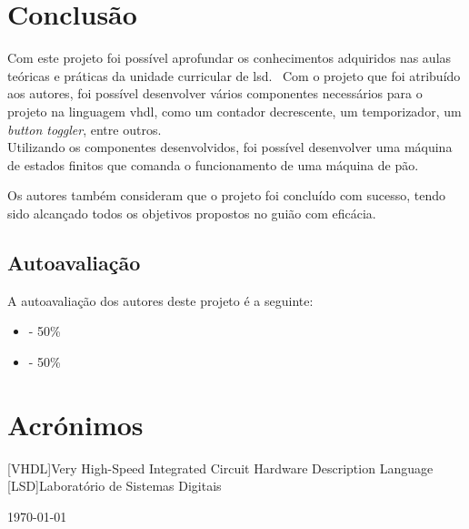 \documentclass{article}
\begin{document}
    \section{Conclusão}\label{sec:conclusao}
        Com este projeto foi possível aprofundar os conhecimentos adquiridos nas aulas teóricas e práticas da unidade curricular de \acs{lsd}. \ Com o projeto que foi atribuído aos autores, foi possível desenvolver vários componentes necessários para o projeto na linguagem \acs{vhdl}, como um contador decrescente, um temporizador, um \textit{button toggler}, entre outros. \\
        Utilizando os componentes desenvolvidos, foi possível desenvolver uma máquina de estados finitos que comanda o funcionamento de uma máquina de pão. \\
        \par Os autores também consideram que o projeto foi concluído com sucesso, tendo sido alcançado todos os objetivos propostos no guião com eficácia.

    \subsection{Autoavaliação}\label{subsec:autoavaliacao}
        A autoavaliação dos autores deste projeto é a seguinte:
        \begin{itemize}
            \item \authorjp - 50\%
            \item \authorrg - 50\%
        \end{itemize}



    \newpage
    \section*{Acrónimos}
    \begin{acronym}
        [VHDL]{Very High-Speed Integrated Circuit Hardware Description Language}
        [LSD]{Laboratório de Sistemas Digitais}
    \end{acronym}

    \begin{flushright}
        \today
    \end{flushright}
\end{document}
